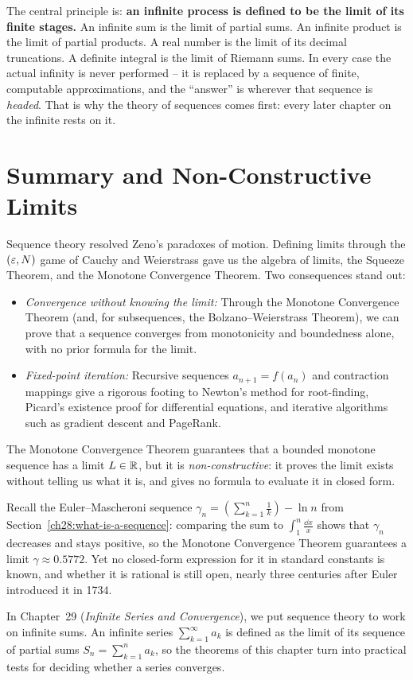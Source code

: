 \begin{aestheticbox}
The central principle is: \textbf{an infinite
process is defined to be the limit of its finite stages.} An infinite sum is the
limit of partial sums. An infinite product is the limit of partial products. A
real number is the limit of its decimal truncations. A definite integral is the
limit of Riemann sums. In every case the actual infinity is never performed --
it is replaced by a sequence of finite, computable approximations, and
the ``answer'' is wherever that sequence is \emph{headed}. That is why the
theory of sequences comes first: every later chapter on the infinite rests on it.
\end{aestheticbox}

\section{Summary and Non-Constructive Limits}

\begin{connectionbox}
Sequence theory resolved Zeno's paradoxes of motion. Defining
limits through the $(\varepsilon, N)$ game of Cauchy and Weierstrass gave us the
algebra of limits, the Squeeze Theorem, and the Monotone Convergence Theorem.
Two consequences stand out:
\begin{itemize}
  \item \emph{Convergence without knowing the limit:} Through the Monotone
  Convergence Theorem (and, for subsequences, the Bolzano--Weierstrass Theorem), we can prove that a
  sequence converges from monotonicity and boundedness alone, with no prior formula for the limit.
  \item \emph{Fixed-point iteration:} Recursive sequences $a_{n+1} = f(a_n)$ and contraction
  mappings give a rigorous footing to Newton's method for root-finding, Picard's existence proof for
  differential equations, and iterative algorithms such as gradient descent and PageRank.
\end{itemize}

The Monotone Convergence Theorem guarantees
that a bounded monotone sequence has a limit $L \in \mathbb{R}$, but it is
\emph{non-constructive}: it proves the limit exists without telling us what it
is, and gives no formula to evaluate it in closed form.

Recall the Euler--Mascheroni sequence $\gamma_n = \left(\sum_{k=1}^n \frac{1}{k}\right) - \ln n$
from Section~\ref{ch28:what-is-a-sequence}: comparing the sum to $\int_1^n \frac{\dd x}{x}$ shows
that $\gamma_n$ decreases and stays positive, so the Monotone Convergence Theorem guarantees
a limit $\gamma \approx 0.5772$. Yet no closed-form expression for it in standard constants is known,
and whether it is rational is still open, nearly three centuries after Euler introduced it in 1734.

In Chapter~29 (\emph{Infinite Series and Convergence}), we put sequence theory to work
on infinite sums.
An infinite series $\sum_{k=1}^\infty a_k$ is defined as the limit of its sequence of partial sums
$S_n = \sum_{k=1}^n a_k$, so the theorems of this chapter turn into practical tests for deciding
whether a series converges.
\end{connectionbox}

